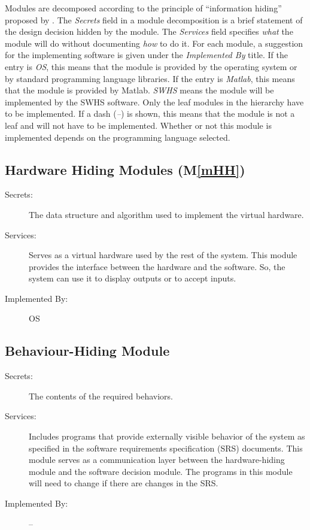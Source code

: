 \documentclass[12pt]{article}
\newcommand{\mref}[1]{M\ref{#1}}
\begin{document}
Modules are decomposed according to the principle of ``information hiding''
proposed by \citet{ParnasEtAl1984}. The \emph{Secrets} field in a module
decomposition is a brief statement of the design decision hidden by the
module. The \emph{Services} field specifies \emph{what} the module will do
without documenting \emph{how} to do it. For each module, a suggestion for the
implementing software is given under the \emph{Implemented By} title. If the
entry is \emph{OS}, this means that the module is provided by the operating
system or by standard programming language libraries. If the entry is
\emph{Matlab}, this means that the module is provided by Matlab.  \emph{SWHS} means the
module will be implemented by the SWHS software.  
Only the leaf modules in the
hierarchy have to be implemented. If a dash (\emph{--}) is shown, this means
that the module is not a leaf and will not have to be implemented. Whether or
not this module is implemented depends on the programming language
selected.

\subsection{Hardware Hiding Modules (\mref{mHH})}

\begin{description}
\item[Secrets:]The data structure and algorithm used to implement the virtual
  hardware.
\item[Services:]Serves as a virtual hardware used by the rest of the
  system. This module provides the interface between the hardware and the
  software. So, the system can use it to display outputs or to accept inputs.
\item[Implemented By:] OS
\end{description}

\subsection{Behaviour-Hiding Module}

\begin{description}
\item[Secrets:]The contents of the required behaviors.
\item[Services:]Includes programs that provide externally visible behavior of
  the system as specified in the software requirements specification (SRS)
  documents. This module serves as a communication layer between the
  hardware-hiding module and the software decision module. The programs in this
  module will need to change if there are changes in the SRS.
\item[Implemented By:] --
\end{description}
\end{document}
